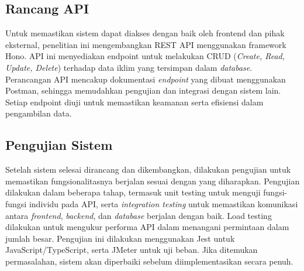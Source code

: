 \subsection{Rancang API}
Untuk memastikan sistem dapat diakses dengan baik oleh frontend dan pihak eksternal, penelitian ini mengembangkan REST API menggunakan framework Hono. API ini menyediakan endpoint untuk melakukan CRUD (\textit{Create, Read, Update, Delete}) terhadap data iklim yang tersimpan dalam \textit{database}. Perancangan API mencakup dokumentasi \textit{endpoint} yang dibuat menggunakan Postman, sehingga memudahkan pengujian dan integrasi dengan sistem lain. Setiap endpoint diuji untuk memastikan keamanan serta efisiensi dalam pengambilan data.

\subsection{Pengujian Sistem}
Setelah sistem selesai dirancang dan dikembangkan, dilakukan pengujian untuk memastikan fungsionalitasnya berjalan sesuai dengan yang diharapkan. Pengujian dilakukan dalam beberapa tahap, termasuk unit testing untuk menguji fungsi-fungsi individu pada API, serta \textit{integration testing} untuk memastikan komunikasi antara \textit{frontend}, \textit{backend}, dan \textit{database} berjalan dengan baik. Load testing dilakukan untuk mengukur performa API dalam menangani permintaan dalam jumlah besar. Pengujian ini dilakukan menggunakan Jest untuk JavaScript/TypeScript, serta JMeter untuk uji beban. Jika ditemukan permasalahan, sistem akan diperbaiki sebelum diimplementasikan secara penuh.
